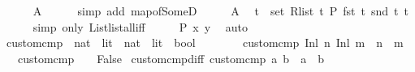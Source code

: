 \begin{isabellebody}
\ \ \ \ \isamarkupfalse%
\ A{}\isanewline
\ \ \ \ \isamarkupfalse%
\ {\isacharparenleft}{\kern0pt}simp\ add{\isacharcolon}{\kern0pt}\ map{\isacharunderscore}{\kern0pt}of{\isacharunderscore}{\kern0pt}SomeD{\isacharparenright}{\kern0pt}\isanewline
\ \ \isamarkupfalse%
\ \isamarkupfalse%
\ A{}\ \isamarkupfalse%
\ {\isachardoublequoteopen}{\isasymforall}t\ {\isasymin}\ set\ {\isacharparenleft}{\kern0pt}R{\isacharunderscore}{\kern0pt}list{\isacharparenright}{\kern0pt}{\isachardot}{\kern0pt}\ {\isacharparenleft}{\kern0pt}{\isasymlambda}t{\isachardot}{\kern0pt}\ P\ {\isacharparenleft}{\kern0pt}fst\ t{\isacharparenright}{\kern0pt}\ {\isacharparenleft}{\kern0pt}snd\ t{\isacharparenright}{\kern0pt}{\isacharparenright}{\kern0pt}\ t{\isachardoublequoteclose}\isanewline
\ \ \ \ \isamarkupfalse%
\ {\isacharparenleft}{\kern0pt}simp\ only{\isacharcolon}{\kern0pt}\ List{\isachardot}{\kern0pt}list{\isacharunderscore}{\kern0pt}all{\isacharunderscore}{\kern0pt}iff{\isacharparenright}{\kern0pt}\isanewline
\ \ \isamarkupfalse%
\ \isamarkupfalse%
\ {\isachardoublequoteopen}P\ x\ y{\isachardoublequoteclose}\ \isamarkupfalse%
\ auto\isanewline
{}\isamarkupfalse%
%
\endisatagproof
{\isafoldproof}%
%
\isadelimproof
\isanewline
%
\endisadelimproof
\isanewline
{}\isamarkupfalse%
\ custom{\isacharunderscore}{\kern0pt}cmp\ {\isacharcolon}{\kern0pt}{\isacharcolon}{\kern0pt}\ {\isachardoublequoteopen}{\isacharparenleft}{\kern0pt}nat\ {\isacharplus}{\kern0pt}\ lit{\isacharparenright}{\kern0pt}\ {\isasymRightarrow}\ {\isacharparenleft}{\kern0pt}nat\ {\isacharplus}{\kern0pt}\ lit{\isacharparenright}{\kern0pt}\ {\isasymRightarrow}\ bool{\isachardoublequoteclose}\isanewline
\ \ \ \isanewline
\ \ \ \ {\isachardoublequoteopen}custom{\isacharunderscore}{\kern0pt}cmp\ {\isacharparenleft}{\kern0pt}Inl\ n{\isacharparenright}{\kern0pt}\ {\isacharparenleft}{\kern0pt}Inl\ m{\isacharparenright}{\kern0pt}\ {\isacharequal}{\kern0pt}\ {\isacharparenleft}{\kern0pt}n\ {\isacharless}{\kern0pt}\ m{\isacharparenright}{\kern0pt}{\isachardoublequoteclose}\isanewline
\ \ {\isacharbar}{\kern0pt}\ {\isachardoublequoteopen}custom{\isacharunderscore}{\kern0pt}cmp\ {\isacharunderscore}{\kern0pt}\ {\isacharunderscore}{\kern0pt}\ {\isacharequal}{\kern0pt}\ False{\isachardoublequoteclose}\isanewline
\isanewline
{}\isamarkupfalse%
\ custom{\isacharunderscore}{\kern0pt}cmp{\isacharunderscore}{\kern0pt}diff{\isacharcolon}{\kern0pt}\ {\isachardoublequoteopen}custom{\isacharunderscore}{\kern0pt}cmp\ a\ b\ {\isasymLongrightarrow}\ a\ {\isasymnoteq}\ b{\isachardoublequoteclose}\isanewline

\end{isabellebody}
